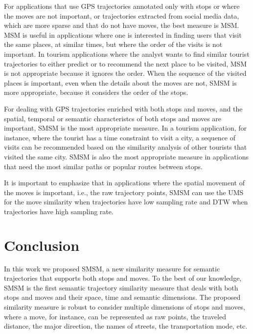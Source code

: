 \documentclass[12pt]{article}
\begin{document}
{For applications that use GPS trajectories annotated only with stops or where the moves are not important, or trajectories extracted from social media data, which are more sparse and that do not have moves, the best measure is MSM. MSM is useful in applications where one is interested in finding users that visit the same places, at similar times, but where the order of the visits is not important. In tourism applications where the analyst wants to find similar tourist trajectories to either predict or to recommend the next place to be visited, MSM is not appropriate because it ignores the order. When the sequence of the visited places is important, even when the details about the moves are not, SMSM is more appropriate, because it considers the order of the stops.}

{For dealing with GPS trajectories enriched with both stops and moves, and the spatial, temporal or semantic characteristcs of both stops and moves are important, SMSM is the most appropriate measure. In a tourism application, for instance, where the tourist has a time constraint to visit a city, a sequence of visits can be recommended based on the similarity analysis of other tourists that visited the same city. SMSM is also the most appropriate measure in applications that need the most similar paths or popular routes between stops.}

{It is important to emphasize that in applications where the spatial movement of the moves is important, i.e., the raw trajectory points, SMSM can use the UMS for the move similarity when trajectories have low sampling rate and DTW when trajectories have high sampling rate.}

\section{Conclusion} \label{sec:conclusions}
In this work we proposed SMSM, a new similarity measure for semantic trajectories that supports both stops and moves.  To the best of our knowledge, SMSM is the first semantic trajectory similarity measure that deals with both stops and moves and their space, time and semantic dimensions. The proposed similarity measure is robust  to consider multiple dimensions of stops and moves, where a move, for instance, can be represented as raw points, the traveled distance, the major direction, the names of streets, the transportation mode, etc.
\end{document}
